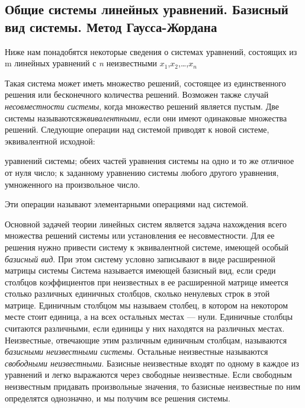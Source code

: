 \documentclass{article}
\begin{document}
\subsection{Общие системы линейных уравнений. Базисный вид системы. Метод Гаусса-Жордана}
Ниже нам понадобятся некоторые сведения о системах уравнений, состоящих из m линейных уравнений с \textit {n} неизвестными $x_1$,$x_2$,\dots,$x_\textit{n}$%

Такая система может иметь множество решений, состоящее из единственного решения или бесконечного количества решений. Возможен также случай \textit{несовместности системы}, когда множество решений является пустым. Две системы называются\textit {эквивалентными}, если они имеют одинаковые множества решений. Следующие операции над системой приводят к новой системе, эквивалентной исходной:
		\begin{enumerate}
			\renewcommand{\theenumi}{(\arabic{enumi})}
			\renewcommand{\labelenumi}{\arabic{enumi})}
			 уравнений системы;
			 обеих частей уравнения системы на одно и то же отличное от нуля число;
			 к заданному уравнению системы любого другого уравнения, умноженного на произвольное число.
		\end{enumerate}
Эти операции называют элементарными операциями над системой.

Основной задачей теории линейных систем является задача нахождения всего множества решений системы или установления ее несовместности. Для ее решения нужно привести систему к эквивалентной системе, имеющей особый \textit{базисный вид}. При этом систему условно записывают в виде расширенной матрицы системы
Система называется имеющей базисный вид, если среди столбцов коэффициентов при неизвестных в ее расширенной матрице имеется столько  различных  единичных  столбцов, сколько  ненулевых строк в этой матрице. Единичным столбцом мы называем столбец, в котором на некотором месте стоит единица, а на всех остальных местах — нули. Единичные столбцы считаются различными, если единицы у них находятся на различных местах. Неизвестные, отвечающие этим различным единичным столбцам, называются \textit{базисными неизвестными системы}. Остальные неизвестные называются \textit{свободными неизвестными}. Базисные неизвестные входят по одному в каждое из уравнений и легко выражаются через свободные неизвестные. Если свободным неизвестным придавать произвольные значения, то базисные неизвестные по ним определятся однозначно, и мы получим все решения системы.
\end{document}
